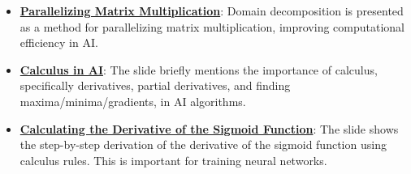 \documentclass{article}%
\begin{document}
\begin{itemize}[leftmargin=*]
\item \href{https://purdue.brightspace.com/d2l/common/assets/pdfjs-d2l-dist/1.0.14-legacy/web/viewer.html?file=\%2Fcontent\%2Fenforced\%2F1095467-wl.202510.CS.24300.001\%2F04L1-Linear Algebra Primer.pdf\%3Fou\%3D1095467\&lang=en-us\&container=d2l-fileviewer-rendered-pdf\&fullscreen=d2l-fileviewer-rendered-pdf-dialog\&height=667#page=18}{\textbf{Parallelizing Matrix Multiplication}}: Domain decomposition is presented as a method for parallelizing matrix multiplication, improving computational efficiency in AI.%
\item \href{https://purdue.brightspace.com/d2l/common/assets/pdfjs-d2l-dist/1.0.14-legacy/web/viewer.html?file=\%2Fcontent\%2Fenforced\%2F1095467-wl.202510.CS.24300.001\%2F04L1-Linear Algebra Primer.pdf\%3Fou\%3D1095467\&lang=en-us\&container=d2l-fileviewer-rendered-pdf\&fullscreen=d2l-fileviewer-rendered-pdf-dialog\&height=667#page=19}{\textbf{Calculus in AI}}: The slide briefly mentions the importance of calculus, specifically derivatives, partial derivatives, and finding maxima/minima/gradients, in AI algorithms.%
\item \href{https://purdue.brightspace.com/d2l/common/assets/pdfjs-d2l-dist/1.0.14-legacy/web/viewer.html?file=\%2Fcontent\%2Fenforced\%2F1095467-wl.202510.CS.24300.001\%2F04L1-Linear Algebra Primer.pdf\%3Fou\%3D1095467\&lang=en-us\&container=d2l-fileviewer-rendered-pdf\&fullscreen=d2l-fileviewer-rendered-pdf-dialog\&height=667#page=21}{\textbf{Calculating the Derivative of the Sigmoid Function}}: The slide shows the step-by-step derivation of the derivative of the sigmoid function using calculus rules. This is important for training neural networks.%
\end{itemize}%
\end{document}
